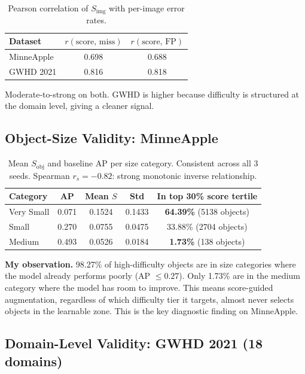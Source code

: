 \documentclass[10pt, a4paper]{article}
\begin{document}
\begin{table}[H]
\centering\small
\caption{Pearson correlation of $S_{\text{img}}$ with per-image error rates.}
\begin{tabular}{lcc}
\toprule
\textbf{Dataset} & $r(\text{score, miss})$ & $r(\text{score, FP})$ \\
\midrule
MinneApple & 0.698 & 0.688 \\
GWHD 2021  & 0.816 & 0.818 \\
\bottomrule
\end{tabular}
\end{table}

Moderate-to-strong on both.
GWHD is higher because difficulty is structured at the domain level,
giving a cleaner signal.

\subsection{Object-Size Validity: MinneApple}

\begin{table}[H]
\centering\small
\caption{Mean $S_{\text{obj}}$ and baseline AP per size category.
  Consistent across all 3 seeds.
  Spearman $r_s=-0.82$: strong monotonic inverse relationship.}
\begin{tabular}{lcccc}
\toprule
\textbf{Category} & \textbf{AP} & \textbf{Mean $S$}
  & \textbf{Std} & \textbf{In top 30\% score tertile} \\
\midrule
Very Small & 0.071 & 0.1524 & 0.1433
  & \textbf{64.39\%} (5138 objects) \\
Small      & 0.270 & 0.0755 & 0.0475
  & 33.88\% (2704 objects) \\
Medium     & 0.493 & 0.0526 & 0.0184
  & \textbf{1.73\%} (138 objects) \\
\bottomrule
\end{tabular}
\end{table}

\textbf{My observation.}
98.27\% of high-difficulty objects are in size categories where
the model already performs poorly (AP $\leq 0.27$).
Only 1.73\% are in the medium category where the model has room
to improve.
This means score-guided augmentation, regardless of which difficulty
tier it targets, almost never selects objects in the learnable zone.
This is the key diagnostic finding on MinneApple.

\subsection{Domain-Level Validity: GWHD 2021 (18 domains)}
\end{document}
